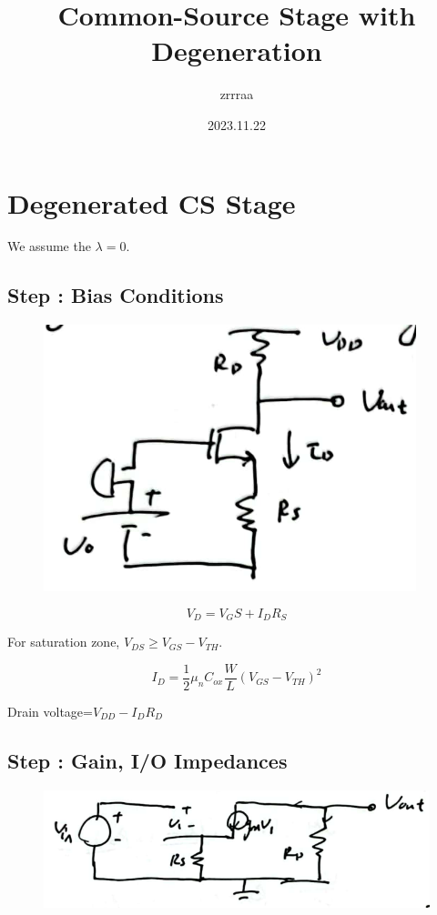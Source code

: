 \documentclass[fontset=windows]{article}
\title{\heiti\zihao{2} Common-Source Stage with Degeneration}
\author{\songti zrrraa}
\date{2023.11.22}
\begin{document}
\maketitle
\thispagestyle{empty}

\section*{Degenerated CS Stage}

We assume the $\lambda=0$. 

\subsection*{Step \uppercase\expandafter{}: Bias Conditions}

\begin{figure}[htbp]
    \centering
    \includegraphics[scale=0.8]{1.jpg}
    \captionsetup{labelformat=empty}
    \caption{}
    \label{1}
\end{figure}

$$V_D=V_GS+I_DR_S$$

For saturation zone, $V_{DS}\geq V_{GS}-V_{TH}$. 

$$I_D=\frac{1}{2}\mu_nC_{ox}\frac{W}{L}(V_{GS}-V_{TH})^2$$

Drain voltage=$V_{DD}-I_DR_D$

\subsection*{Step \uppercase\expandafter{}: Gain, I/O Impedances}

\begin{figure}[htbp]
    \centering
    \includegraphics[scale=0.8]{2.jpg}
    \captionsetup{labelformat=empty}
    \caption{}
    \label{2}
\end{figure}
\end{document}
